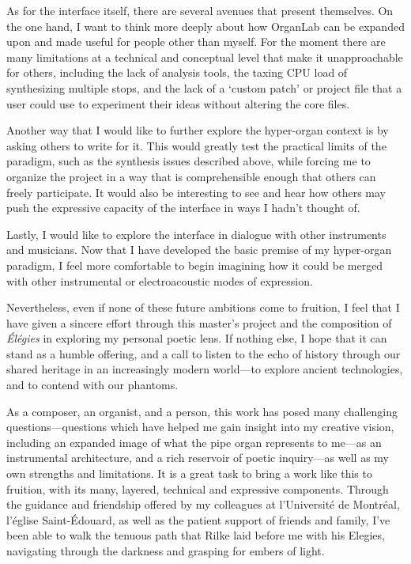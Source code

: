 \documentclass[12pt,twoside,maitrise]{dms_ks}
\theoremstyle{definition}
\begin{document}
{As for the interface itself, there are several avenues that present themselves. 
On the one hand, I want to think more deeply about how OrganLab can be expanded upon and made useful for people other than myself. 
For the moment there are many limitations at a technical and conceptual level that make it unapproachable for others, including the lack of analysis tools, the taxing CPU load of synthesizing multiple stops, and the lack of a `custom patch' or project file that a user could use to experiment their ideas without altering the core files. 

Another way that I would like to further explore the hyper-organ context is by asking others to write for it. 
This would greatly test the practical limits of the paradigm, such as the synthesis issues described above, while forcing me to organize the project in a way that is comprehensible enough that others can freely participate. 
It would also be interesting to see and hear how others may push the expressive capacity of the interface in ways I hadn't thought of.

Lastly, I would like to explore the interface in dialogue with other instruments and musicians. 
Now that I have developed the basic premise of my hyper-organ paradigm, I feel more comfortable to begin imagining how it could be merged with other instrumental or electroacoustic modes of expression.

Nevertheless, even if none of these future ambitions come to fruition, I feel that I have given a sincere effort through this master's project and the composition of \textit{Élégies} in exploring my personal poetic lens. 
If nothing else, I hope that it can stand as a humble offering, and a call to listen to the echo of history through our shared heritage in an increasingly modern world---to explore ancient technologies, and to contend with our phantoms.

As a composer, an organist, and a person, this work has posed many challenging questions---questions which have helped me gain insight into my creative vision, including an expanded image of what the pipe organ represents to me---as an instrumental architecture, and a rich reservoir of poetic inquiry---as well as my own strengths and limitations. 
It is a great task to bring a work like this to fruition, with its many, layered, technical and expressive components. 
Through the guidance and friendship offered by my colleagues at l'Université de Montréal, l'église Saint-Édouard, as well as the patient support of friends and family, I've been able to walk the tenuous path that Rilke laid before me with his Elegies, navigating through the darkness and grasping for embers of light. 

}
\end{document}
